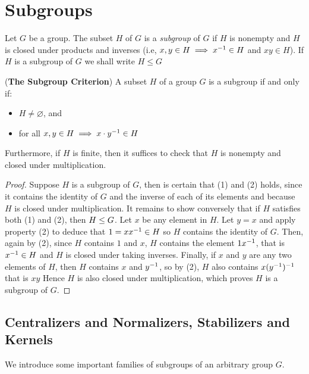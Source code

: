 \section{Subgroups}

\begin{defn}
	Let $ G $ be a group. The subset $ H $ of $ G  $ is a \emph{subgroup} of $ G $ if $ H $ is nonempty and $ H $ is closed under products and inverses (i.e, $ x,y \in H \implies x^{-1} \in H $ and $ xy \in H $). If $ H $ is a subgroup of $ G $ we shall write $ H \leq G $
\end{defn}

\begin{prop}
	(\textbf{The Subgroup Criterion}) A subset $ H $ of a group $ G $ is a subgroup if and only if:
	\begin{itemize}
		\item $ H \neq \varnothing $, and
		\item for all $ x,y \in H \implies x \cdot y^{-1} \in H $
	\end{itemize}
	Furthermore, if $ H $ is finite, then it suffices to check that $ H $ is nonempty and closed under multiplication.
\end{prop}
\begin{proof}
	Suppose $ H $ is a subgroup of $ G $, then is certain that (1) and (2)  holds, since it contains the identity of $ G $ and the inverse of each of its elements and because $ H $ is closed under multiplication.
	It remains to show conversely that if $ H $ satisfies both (1)  and (2), then $ H \leq G $. Let $ x $ be any element in $ H $. Let $ y =x $ and apply property (2) to deduce that $ 1 = xx^{-1} \in H $ so $ H $ contains the identity of $ G $. Then, again by (2), since $ H $ contains $ 1 $ and $ x $, $ H $ contains the element $ 1x^{-1}  $, that is$ x^{-1} \in H $ and $ H  $ is closed under taking inverses. Finally, if $ x $ and $ y $ are any two elements of $ H $, then $ H $ contains $ x $ and $ y ^{-1} $, so by (2), $ H $ also contains $ x(y^{-1})^{-1} $ that is $ xy $ Hence $ H $ is also closed under multiplication, which proves $ H $ is a subgroup of $ G $.
\end{proof}

\subsection{Centralizers and Normalizers, Stabilizers and Kernels}
We introduce some important families of subgroups of an arbitrary group $ G $.

